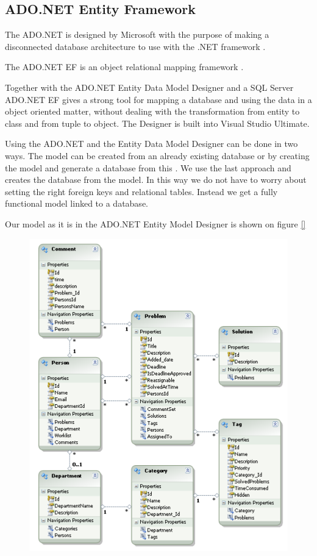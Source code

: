 \subsection{ADO.NET Entity Framework}
\label{sub:adonet}
The ADO.NET is designed by Microsoft with the purpose of making a disconnected database architecture to use with the .NET framework \cite{adonetDesignGoal}.

The ADO.NET EF is an object relational mapping framework \cite{adonetEntityFramework}.

Together with the ADO.NET Entity Data Model Designer and a SQL Server ADO.NET EF gives a strong tool for mapping a database and using the data in a object oriented matter, without dealing with the transformation from entity to class and from tuple to object. 
The Designer is built into Visual Studio Ultimate. 

Using the ADO.NET and the Entity Data Model Designer can be done in two ways. 
The  model can be created from an already existing database or by creating the model and generate a database from this \cite{adonetEntityDataModelDesigner}.
We use the last approach and creates the database from the model. 
In this way we do not have to worry about setting the right foreign keys and relational tables. Instead we get a fully functional model linked to a database. 

Our model as it is in the ADO.NET Entity Model Designer is shown on figure \ref{}
\begin{figure}
	\centering
		\includegraphics[scale=0.8]{input/implementation/mvc/Model.pdf}
	\label{fig:balanceWorkloadDiagram}
\end{figure}





